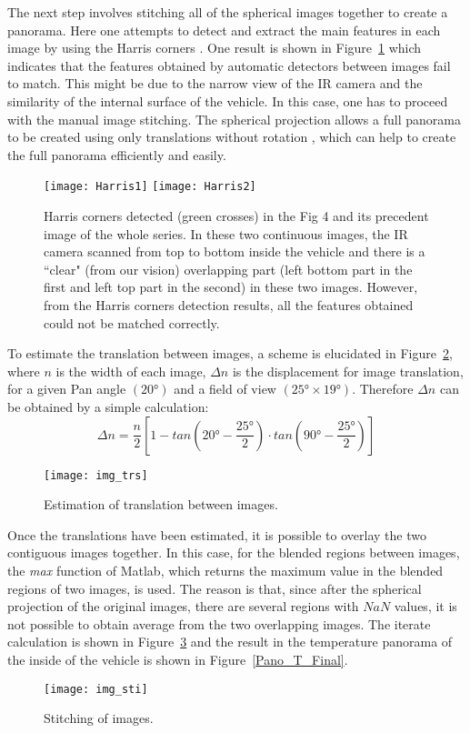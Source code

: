 \documentclass{tQRT2e}
\begin{document}
The next step involves stitching all of the spherical images together to create a panorama. Here one attempts to detect and extract the main features in each image by using the Harris corners \cite{Harris1988}. One result is shown in Figure~\ref{Harris} which indicates that the features obtained by automatic detectors between images fail to match. This might be due to the narrow view of the IR camera and the similarity of the internal surface of the vehicle. In this case, one has to proceed with the manual image stitching.  The spherical projection allows a full panorama to be created using only translations without rotation \cite{Szeliski1997}, which can help to create the full panorama efficiently and easily.
\begin{figure}[ht]
	\texttt{[image: Harris1]}
	\texttt{[image: Harris2]}
	\caption{Harris corners detected (green crosses) in the Fig 4 and its precedent image of the whole series. In these two continuous images, the IR camera scanned from top to bottom inside the vehicle and there is a ``clear" (from our vision) overlapping part (left bottom part in the first and left top part in the second) in these two images. However, from the Harris corners detection results, all the features obtained could not be matched correctly.}
	\label{Harris}
\end{figure}

To estimate the translation between images, a scheme is elucidated in Figure~\ref{Trans}, where $ n $ is the width of each image, $ \Delta n $ is the displacement for image translation, for a given Pan angle $ (20°) $ and a field of view $ (25° \times 19°) $. Therefore $ \Delta n $ can be obtained by a simple calculation:
\begin{equation}
\Delta n=\dfrac{n}{2}[1-tan(20°-\dfrac{25°}{2})\cdot tan(90°-\dfrac{25°}{2})]
\end{equation}

\begin{figure}[ht]
	\centering
	\texttt{[image: img\_trs]}
	\caption{ Estimation of translation between images.}
	\label{Trans}
\end{figure}

Once the translations have been estimated, it is possible to overlay the two contiguous images together. In this case, for the blended regions between images, the \textit{max} function of Matlab, which returns the maximum value in the blended regions of two images, is used. The reason is that, since after the spherical projection of the original images, there are several regions with $ NaN $ values, it is not possible to obtain average from the two overlapping images. The iterate calculation is shown in Figure~\ref{img_sti} and the result in the temperature panorama of the inside of the vehicle is shown in Figure~\ref{Pano_T_Final}.
\begin{figure}[ht]
	\centering
	\texttt{[image: img\_sti]}
	\caption{Stitching of images.}
	\label{img_sti}
\end{figure}
\end{document}
